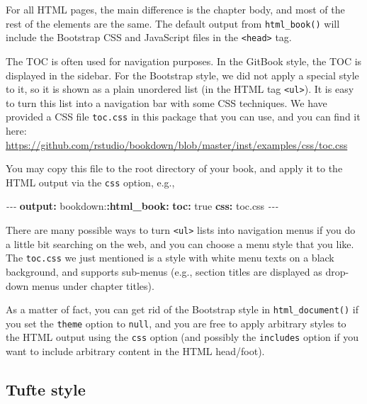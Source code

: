\documentclass[
  12pt,
]{krantz}
\newenvironment{Shaded}{\begin{snugshade}}{\end{snugshade}}
\newcommand{\AttributeTok}[1]{\textcolor[rgb]{0.13,0.29,0.53}{#1}}
\newcommand{\CharTok}[1]{\textcolor[rgb]{0.31,0.60,0.02}{#1}}
\newcommand{\FunctionTok}[1]{\textcolor[rgb]{0.13,0.29,0.53}{\textbf{#1}}}
\newcommand{\KeywordTok}[1]{\textcolor[rgb]{0.13,0.29,0.53}{\textbf{#1}}}
\newcommand{\PreprocessorTok}[1]{\textcolor[rgb]{0.56,0.35,0.01}{\textit{#1}}}
\theoremstyle{definition}
\theoremstyle{definition}
\theoremstyle{definition}
\theoremstyle{definition}
\theoremstyle{remark}
\begin{document}
For all HTML pages, the main difference is the chapter body, and most of the rest of the elements are the same. The default output from \texttt{html\_book()} will include the Bootstrap CSS and JavaScript files in the \texttt{\textless{}head\textgreater{}} tag.

The TOC is often used for navigation purposes. In the GitBook style, the TOC is displayed in the sidebar. For the Bootstrap style, we did not apply a special style to it, so it is shown as a plain unordered list (in the HTML tag \texttt{\textless{}ul\textgreater{}}). It is easy to turn this list into a navigation bar with some CSS techniques. We have provided a CSS file \texttt{toc.css} in this package that you can use, and you can find it here: \url{https://github.com/rstudio/bookdown/blob/master/inst/examples/css/toc.css}

You may copy this file to the root directory of your book, and apply it to the HTML output via the \texttt{css} option, e.g.,

\begin{Shaded}
\begin{Highlighting}[]
\PreprocessorTok{{-}{-}{-}}
\FunctionTok{output}\KeywordTok{:}
\AttributeTok{  bookdown:}\FunctionTok{:html\_book}\KeywordTok{:}
\AttributeTok{    }\FunctionTok{toc}\KeywordTok{:}\AttributeTok{ }\CharTok{true}
\AttributeTok{    }\FunctionTok{css}\KeywordTok{:}\AttributeTok{ toc.css}
\PreprocessorTok{{-}{-}{-}}
\end{Highlighting}
\end{Shaded}

There are many possible ways to turn \texttt{\textless{}ul\textgreater{}} lists into navigation menus if you do a little bit searching on the web, and you can choose a menu style that you like. The \texttt{toc.css} we just mentioned is a style with white menu texts on a black background, and supports sub-menus (e.g., section titles are displayed as drop-down menus under chapter titles).

As a matter of fact, you can get rid of the Bootstrap style in \texttt{html\_document()} if you set the \texttt{theme} option to \texttt{null}, and you are free to apply arbitrary styles to the HTML output using the \texttt{css} option (and possibly the \texttt{includes} option if you want to include arbitrary content in the HTML head/foot).

\subsection{Tufte style}\label{tufte-style}
\end{document}
